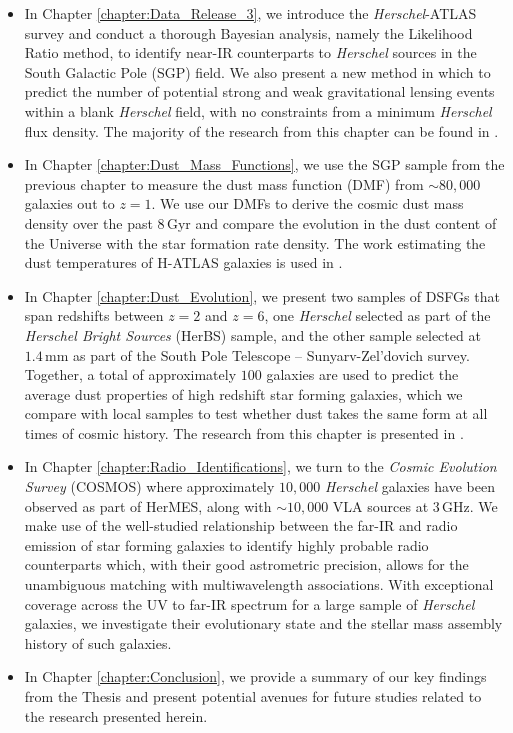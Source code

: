 \begin{itemize}
	\item In Chapter \ref{chapter:Data_Release_3}, we introduce the \textit{Herschel}-ATLAS survey and conduct a thorough Bayesian analysis, namely the Likelihood Ratio method, to identify near-IR counterparts to \textit{Herschel} sources in the South Galactic Pole (SGP) field. We also present a new method in which to predict the number of potential strong and weak gravitational lensing events within a blank \textit{Herschel} field, with no constraints from a minimum \textit{Herschel} flux density. The majority of the research from this chapter can be found in \citealt{Ward_2022}.
	\item In Chapter \ref{chapter:Dust_Mass_Functions}, we use the SGP sample from the previous chapter to measure the dust mass function (DMF) from $\sim80,000$ galaxies out to $z = 1$. We use our DMFs to derive the cosmic dust mass density over the past $8\,$Gyr and compare the evolution in the dust content of the Universe with the star formation rate density. The work estimating the dust temperatures of H-ATLAS galaxies is used in \citealt{Eales_2024}.
	\item In Chapter \ref{chapter:Dust_Evolution}, we present two samples of DSFGs that span redshifts between $z = 2$ and $z = 6$, one \textit{Herschel} selected as part of the \textit{Herschel Bright Sources} (HerBS) sample, and the other sample selected at $1.4\,$mm as part of the South Pole Telescope -- Sunyarv-Zel'dovich survey. Together, a total of approximately $100$ galaxies are used to predict the average dust properties of high redshift star forming galaxies, which we compare with local samples to test whether dust takes the same form at all times of cosmic history. The research from this chapter is presented in \citealt{Ward_2024}.
	\item In Chapter \ref{chapter:Radio_Identifications}, we turn to the \textit{Cosmic Evolution Survey} (COSMOS) where approximately $10,000$ \textit{Herschel} galaxies have been observed as part of HerMES, along with $\sim10,000$ VLA sources at $3\,$GHz. We make use of the well-studied relationship between the far-IR and radio emission of star forming galaxies to identify highly probable radio counterparts which, with their good astrometric precision, allows for the unambiguous matching with multiwavelength associations. With exceptional coverage across the UV to far-IR spectrum for a large sample of \textit{Herschel} galaxies, we investigate their evolutionary state and the stellar mass assembly history of such galaxies.
	\item In Chapter \ref{chapter:Conclusion}, we provide a summary of our key findings from the Thesis and present potential avenues for future studies related to the research presented herein.
\end{itemize}

